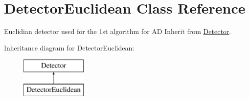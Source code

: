 \hypertarget{classDetectorEuclidean}{}\section{Detector\+Euclidean Class Reference}
\label{classDetectorEuclidean}


Euclidian detector used for the 1st algorithm for A\+D Inherit from \hyperlink{classDetector}{Detector}.  


Inheritance diagram for Detector\+Euclidean\+:\begin{figure}[H]
\begin{center}
\leavevmode
\includegraphics[height=2.000000cm]{classDetectorEuclidean}
\end{center}
\end{figure}
